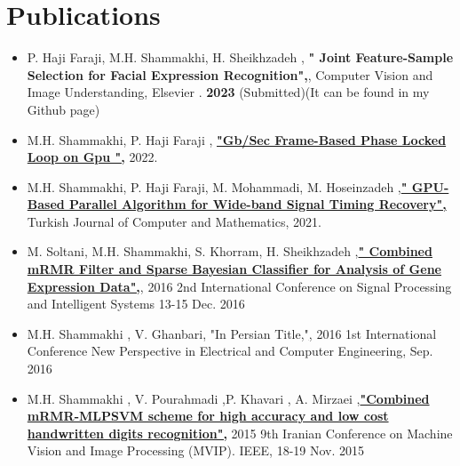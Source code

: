 \section{Publications}
\begin{itemize}



	               \item{{P. Haji Faraji, M.H. Shammakhi, H. Sheikhzadeh , {\bf " Joint Feature-Sample Selection for Facial Expression Recognition",}, Computer Vision and Image Understanding,   Elsevier . {\bf2023} (Submitted)(It can be found in my Github page)}} \\
                    \vspace{-0.6cm}
                        \item{M.H. Shammakhi, P. Haji Faraji , {\href{https://papers.ssrn.com/sol3/papers.cfmabstract_id=4100444}{\bf "Gb/Sec Frame-Based Phase Locked Loop on Gpu ",} 2022}.} \\
				
				\vspace{-0.6cm}	
									
					\item{M.H. Shammakhi, P. Haji Faraji, M. Mohammadi, M. Hoseinzadeh ,{\href{https://github.com/mhshammakhi/SDR_GPU/blob/main/Gardner_Parallel/V1/13itctcon_Paper.pdf} {\bf " GPU-Based Parallel Algorithm for Wide-band Signal Timing Recovery",} Turkish Journal of Computer and Mathematics, 2021.}} \\				
				\vspace{-0.6cm}

					\item{M. Soltani, M.H. Shammakhi, S. Khorram, H. Sheikhzadeh ,{\href{https://ieeexplore.ieee.org/document/7869891} {\bf " Combined mRMR Filter and Sparse Bayesian Classifier for Analysis of Gene Expression Data",}, 2016 2nd International Conference on Signal Processing and Intelligent Systems 13-15 Dec. 2016}} \\
				\vspace{-0.6cm}					
					\item{M.H. Shammakhi , V. Ghanbari, "{In Persian Title,}"{\href{https://en.civilica.com/doc/555802/}, 2016 1st International Conference New Perspective in Electrical and Computer Engineering,  Sep. 2016}}\\
                \vspace{-0.6cm}
					\item{M.H. Shammakhi , V. Pourahmadi ,P. Khavari , A. Mirzaei ,{\href{https://ieeexplore.ieee.org/abstract/document/7397526} {\bf "Combined mRMR-MLPSVM scheme for high accuracy and low cost handwritten digits recognition",} 2015 9th Iranian Conference on Machine Vision and Image Processing (MVIP). IEEE, 18-19 Nov. 2015}}\\


\end{itemize}

